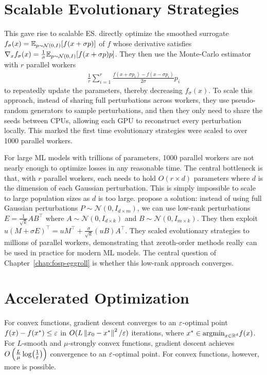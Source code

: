 \section{Scalable Evolutionary Strategies}
This gave rise to scalable ES. \citet{salimans2017evolution} directly optimize the smoothed surrogate $f_\sigma(x) = \mathbb{E}_{p \sim \mathcal N(0,I)}[f(x + \sigma p)]$ of $f$ whose derivative satisfies $\nabla_x f_\sigma(x) = \frac{1}{\sigma} \mathbb{E}_{p \sim \mathcal N(0,I)}[f(x+\sigma p) p]$. They then use the Monte-Carlo estimator with $r$ parallel workers
\begin{align*}
    \frac{1}{r} \sum_{i=1}^r \frac{f(x+ \sigma p_i) - f(x-\sigma p_i)}{2\sigma} p_i
\end{align*} 
to repeatedly update the parameters, thereby decreasing $f_\sigma(x)$. To scale this approach, instead of sharing full perturbations across workers, they use pseudo-random generators to sample perturbations, and then they only need to share the seeds between CPUs, allowing each GPU to reconstruct every perturbation locally. This marked the first time evolutionary strategies were scaled to over 1000 parallel workers. 

For large ML models with trillions of parameters, 1000 parallel workers are not nearly enough to optimize losses in any reasonable time. The central bottleneck is that, with $r$ parallel workers, each needs to hold $O(r \times d)$ parameters where $d$ is the dimension of each Gaussian perturbation. This is simply impossible to scale to large population sizes as $d$ is too large. \citet{sarkar2025evolution} propose a solution: instead of using full Gaussian perturbations $P \sim \mathcal N(0, I_{d \times m})$, we can use low-rank perturbations $E = \frac{1}{\sqrt{k}} AB^\top$ where $A \sim \mathcal N(0, I_{d\times k})$ and $B \sim \mathcal N(0, I_{m \times k})$. They then exploit $u(M + \sigma E)^\top = uM^\top + \frac{\sigma}{\sqrt{k}} (uB)A^\top$. They scaled evolutionary strategies to millions of parallel workers, demonstrating that zeroth-order methods really can be used in practice for modern ML models. The central question of Chapter~\ref{chap:fosp-eggroll} is whether this low-rank approach converges.

\section{Accelerated Optimization}
For convex functions, gradient descent converges to an $\varepsilon$-optimal point $f(x) - f(x^*) \leq \varepsilon$ in $O(L\left\lVert x_0-x^* \right\rVert^2/\varepsilon)$ iterations, where $x^* \in \mathrm{argmin}_{x \in \mathbb{R}^d} f(x)$. For $L$-smooth and $\mu$-strongly convex functions, gradient descent achieves $O\left(\frac{L}{\mu} \log(\frac{1}{\varepsilon})\right)$ convergence to an $\varepsilon$-optimal point. For convex functions, however, more is possible.

